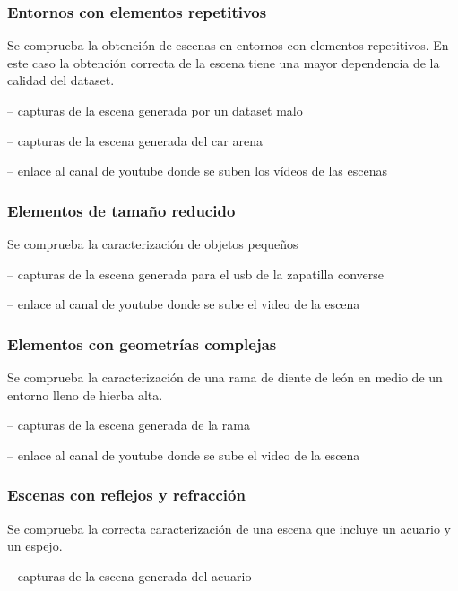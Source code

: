 \documentclass[a4paper, 12pt, spanish, twoside]{article}
\begin{document}
\subsubsection {Entornos con elementos repetitivos} \label{sec:implementacion:limites-3dgs:repetitivos}

Se comprueba la obtención de escenas en entornos con elementos repetitivos. En este caso la obtención correcta de la escena tiene una mayor dependencia de la calidad del dataset. 

-- capturas de la escena generada por un dataset malo 

-- capturas de la escena generada del car arena 

-- enlace al canal de youtube donde se suben los vídeos de las escenas 

\subsubsection {Elementos de tamaño reducido} \label{sec:implementacion:limites-3dgs:reducido}

Se comprueba la caracterización de objetos pequeños 

-- capturas de la escena generada para el usb de la zapatilla converse 

-- enlace al canal de youtube donde se sube el video de la escena 

\subsubsection {Elementos con geometrías complejas} \label{sec:implementacion:limites-3dgs:complejas}

Se comprueba la caracterización de una rama de diente de león en medio de un entorno lleno de hierba alta. 

-- capturas de la escena generada de la rama 

-- enlace al canal de youtube donde se sube el video de la escena 

\subsubsection {Escenas con reflejos y refracción} \label{sec:implementacion:limites-3dgs:reflejos}

Se comprueba la correcta caracterización de una escena que incluye un acuario y un espejo. 

-- capturas de la escena generada del acuario 
\end{document}
